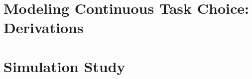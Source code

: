 \documentclass[12pt, a4paper, oneside, full]{article}
\begin{document}
\newpage
\printbibliography



\newpage
{} %
\begin{appendix}

\section{Modeling Continuous Task Choice: Derivations}





\section{Simulation Study}



\end{appendix}
\end{document}

